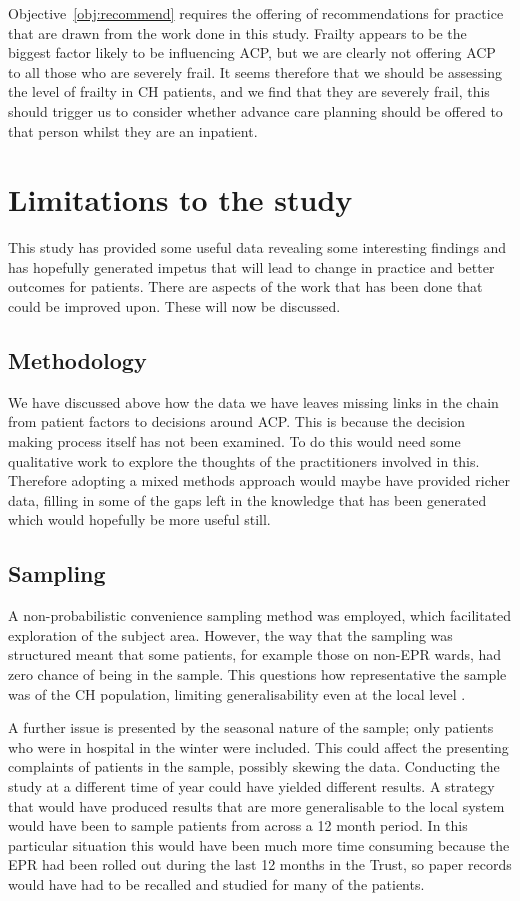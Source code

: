 \documentclass
[
	12pt,
	a4paper,
	oneside,
]{report}
\begin{document}
Objective~\ref{obj:recommend} requires the offering of recommendations for 
practice that are drawn from the work done in this study. Frailty appears
to be the biggest factor likely to be influencing ACP, but we are clearly
not offering ACP to all those who are severely frail. It seems therefore that
we should be assessing the level of frailty in CH patients, and we find that 
they are severely frail, this should trigger us to consider whether advance 
care planning should be offered to that person whilst they are an inpatient.

\section{Limitations to the study}

This study has provided some useful data revealing some interesting findings
and has hopefully generated impetus that will lead to change in practice and
better outcomes for patients. There are aspects of the work that has been done
that could be improved upon. These will now be discussed.

\subsection{Methodology}

We have discussed above how the data we have leaves missing links in the 
chain from patient factors to decisions around ACP. This is because the
decision making process itself has not been examined. To do this would need 
some qualitative work to explore the thoughts of the practitioners involved
in this. Therefore adopting a mixed methods approach 
would maybe have provided richer data, filling in some of the gaps left in the
knowledge that has been generated which would hopefully be more useful still.

\subsection{Sampling}
A non-probabilistic convenience sampling method was employed, which facilitated 
exploration of the subject area. However, the way that the sampling was 
structured meant that some patients, for example those on non-EPR wards, had
zero chance of being in the sample. This questions how representative the sample
was of the CH population, limiting generalisability even at the local level 
\parencite{biggam:15}.

A further issue is presented by the seasonal 
nature of the sample; only patients who were in hospital in the winter were 
included. This could affect the presenting complaints of patients in the sample,
possibly skewing the data.
Conducting the study at a different time of year could have yielded different 
results. A strategy that would have produced results that are more generalisable
to the local system would have been to sample patients from across
a 12 month period. In this particular situation this would have been much more
time consuming because the EPR had been rolled out during the last 12 months in
the Trust, so paper records would have had to be recalled and studied for many
of the patients. 
\end{document}

